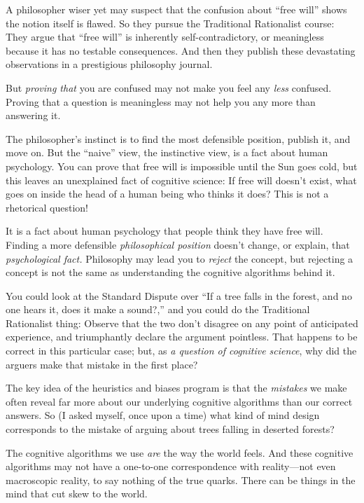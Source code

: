{
 A philosopher wiser yet may suspect that the confusion about
``free will'' shows the notion
itself is flawed. So they pursue the Traditional Rationalist course:
They argue that ``free will'' is
inherently self-contradictory, or meaningless because it has no
testable consequences. And then they publish these devastating
observations in a prestigious philosophy journal.}

{
 But \textit{proving that} you are confused may not make you feel
any \textit{less} confused. Proving that a question is meaningless may
not help you any more than answering it.}

{
 The philosopher's instinct is to find the most
defensible position, publish it, and move on. But the
``naive'' view, the instinctive
view, is a fact about human psychology. You can prove that free will is
impossible until the Sun goes cold, but this leaves an unexplained fact
of cognitive science: If free will doesn't exist, what
goes on inside the head of a human being who thinks it does? This is
not a rhetorical question!}

{
 It is a fact about human psychology that people think they have
free will. Finding a more defensible \textit{philosophical position}
doesn't change, or explain, that \textit{psychological
fact.} Philosophy may lead you to \textit{reject} the concept, but
rejecting a concept is not the same as understanding the cognitive
algorithms behind it.}

{
 You could look at the Standard Dispute over ``If
a tree falls in the forest, and no one hears it, does it make a
sound?,'' and you could do the Traditional
Rationalist thing: Observe that the two don't disagree
on any point of anticipated experience, and triumphantly declare the
argument pointless. That happens to be correct in this particular case;
but, as \textit{a question of cognitive science}, why did the arguers
make that mistake in the first place?}

{
 The key idea of the heuristics and biases program is that the
\textit{mistakes} we make often reveal far more about our underlying
cognitive algorithms than our correct answers. So (I asked myself, once
upon a time) what kind of mind design corresponds to the mistake of
arguing about trees falling in deserted forests?}

{
 The cognitive algorithms we use \textit{are} the way the world
feels. And these cognitive algorithms may not have a one-to-one
correspondence with reality---not even macroscopic reality, to say
nothing of the true quarks. There can be things in the mind that cut
skew to the world.}

